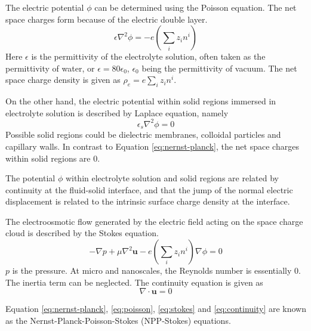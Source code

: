The electric potential $\phi$ can be determined using the Poisson equation. The net space charges form because of the electric double layer.
\begin{equation}
\epsilon \nabla^2 \phi = -e\left( \sum_i z_i n^i \right) 
\label{eq:poisson}
\end{equation} 
Here $\epsilon$ is the permittivity of the electrolyte solution, often taken as the permittivity of water, or $\epsilon = 80\epsilon_0$, $\epsilon_0$ being the permittivity of vacuum. The net space charge density is given as $\rho_e = e\sum_i z_i n^i$.

On the other hand, the electric potential within solid regions immersed in electrolyte solution is described by Laplace equation, namely
\begin{equation}
\epsilon_s \nabla^2 \phi = 0
\label{eq:laplace}
\end{equation}
Possible solid regions could be dielectric membranes, colloidal particles and capillary walls. In contrast to Equation \ref{eq:nernst-planck}, the net space charges within solid regions are 0.

The potential $\phi$ within electrolyte solution and solid regions are related by continuity at the fluid-solid interface, and that the jump of the normal electric displacement is related to the intrinsic surface charge density at the interface.

The electroosmotic flow generated by the electric field acting on the space charge cloud is described by the Stokes equation.
\begin{equation}
-\nabla p + \mu\nabla^2\mathbf{u} - e\left( \sum_i z_i n^i \right) \nabla\phi = 0
\label{eq:stokes}
\end{equation}
$p$ is the pressure. At micro and nanoscales, the Reynolds number is essentially 0. The inertia term can be neglected. The continuity equation is given as
\begin{equation}
\nabla \cdot \mathbf{u} = 0
\label{eq:continuity}
\end{equation}

Equation \ref{eq:nernst-planck}, \ref{eq:poisson}, \ref{eq:stokes} and \ref{eq:continuity} are known as the Nernst-Planck-Poisson-Stokes (NPP-Stokes) equations.

